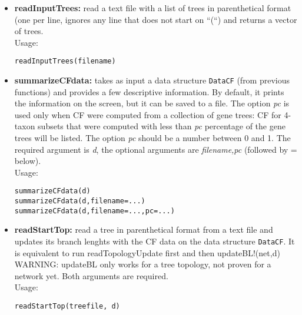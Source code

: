 \documentclass[12pt]{article}
\begin{document}
\begin{itemize}
\item \textbf{readInputTrees:} read a text file with a list of trees
  in parenthetical format (one per line, ignores any line that does
  not start on ``(``) and
  returns a vector of trees.\\
  Usage:
\begin{lstlisting}
readInputTrees(filename)
\end{lstlisting}

\item \textbf{summarizeCFdata:} takes as input a data structure \texttt{DataCF} (from
  previous functions) and provides a few descriptive information. By
  default, it prints the information on the screen, but it can be
  saved to a file. The option \textit{pc} is used only when CF were
  computed from a collection of gene trees: CF for 4-taxon subsets
  that were computed with less than \textit{pc} percentage of the gene
  trees will be listed. The option \textit{pc} should be a number
  between 0 and 1. The required argument is \textit{d}, the optional
  arguments are \textit{filename,pc} (followed by = below).\\
Usage:
\begin{lstlisting}
summarizeCFdata(d)
summarizeCFdata(d,filename=...)
summarizeCFdata(d,filename=...,pc=...)
\end{lstlisting}

\item \textbf{readStartTop:} read a tree in parenthetical format from
  a text file and updates its branch lenghts with the CF data on
  the data structure \texttt{DataCF}. It is equivalent to run
  readTopologyUpdate first and then updateBL!(net,d)\\
  WARNING: updateBL only works for a tree topology, not proven for a
  network yet. Both arguments are required.\\  Usage:
\begin{lstlisting}
readStartTop(treefile, d)
\end{lstlisting}

\end{itemize}
\end{document}
